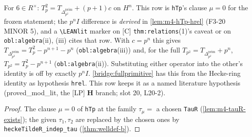 \begin{theorem}[$T_p^2=T_{\Delta^{\mathrm{prim}}_{p^2}}+(p+1)c$, the clause $\mu=0$ of \texttt{hTp}]\label{thm:relations-psq-model}
  \leanok
  For $6\in R^\times$: $T_p^2=T_{\Delta^{\mathrm{prim}}_{p^2}}+(p+1)c$ on $H^n$. This row is \texttt{hTp}'s clause $\mu=0$ for
  the frozen statement; the $p^nI$ difference is \emph{derived} in \ref{lem:m4-hTp-hrel} (F3-20 MINOR 5), and a
  \texttt{\textbackslash LEANlit} marker on [C] \texttt{thm:relations}(1)'s caveat or on \texttt{obl:algebra}(ii), (iii) cites that
  row. With $c=p^n$ this gives
  $T_{\Delta^{\mathrm{prim}}_{p^2}}=T_p^2-p^{n+1}-p^n$ (\texttt{obl:algebra}(iii)) and, for the full
  $T_{p^2}=T_{\Delta^{\mathrm{prim}}_{p^2}}+p^n$, $T_{p^2}=T_p^2-p^{n+1}$ (\texttt{obl:algebra}(ii)). Substituting either operator
  into the other's identity is off by exactly $p^nI$. \ref{bridge:fullprimitive} has this from the Hecke-ring identity as
  hypothesis \texttt{hrel}. This row keeps it as a named literature hypothesis (\textsf{proved\_mod\_lit}, the [LP]
  \textbf{H} branch; slot 20, L20-2).
\end{theorem}
\begin{proof}
  \leanok
  The clause $\mu=0$ of \texttt{hTp} at the family $\tau_\mu=$ a chosen \texttt{TauR} (\ref{lem:m4-tauR-exists}); the given
  $\tau_1,\tau_2$ are replaced by the chosen ones by \texttt{heckeTildeR\_indep\_tau} (\ref{thm:welldef-b}).
\end{proof}

